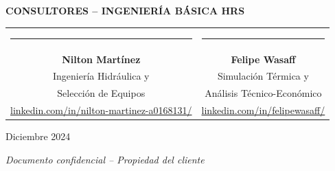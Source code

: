 \documentclass[12pt,a4paper]{article}
\begin{document}
\vspace{2cm}

\begin{center}
\textbf{\large CONSULTORES -- INGENIERÍA BÁSICA HRS}

\vspace{1cm}

\begin{tabular}{cc}
\rule{5cm}{0.4pt} & \rule{5cm}{0.4pt} \\
\textbf{Nilton Martínez} & \textbf{Felipe Wasaff} \\
Ingeniería Hidráulica y & Simulación Térmica y \\
Selección de Equipos & Análisis Técnico-Económico \\
\href{https://linkedin.com/in/nilton-martinez-a0168131/}{linkedin.com/in/nilton-martinez-a0168131/} & \href{https://linkedin.com/in/felipewasaff/}{linkedin.com/in/felipewasaff/} \\
\end{tabular}

\vspace{1cm}

Diciembre 2024

\vspace{0.5cm}

\textit{Documento confidencial -- Propiedad del cliente}
\end{center}
\end{document}
